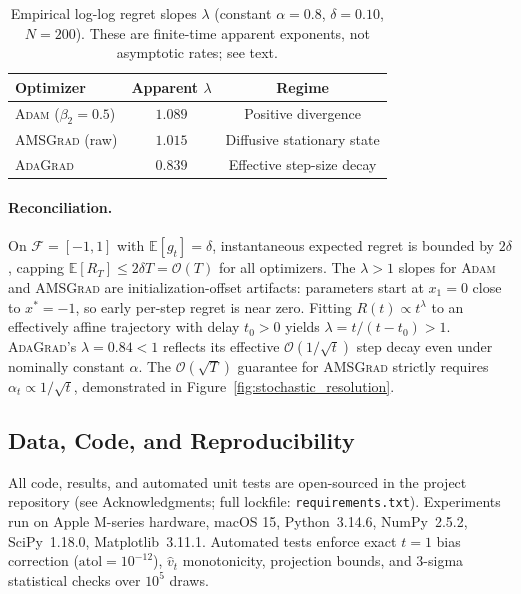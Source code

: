 \begin{table}[h]
\centering
\scriptsize
\caption{Empirical log-log regret slopes $\lambda$ (constant $\alpha=0.8$, $\delta=0.10$, $N=200$). These are finite-time apparent exponents, not asymptotic rates; see text.}
\label{tab:lambda_slopes}
\begin{tabular}{lcc}
\toprule
\textbf{Optimizer} & Apparent $\lambda$ & Regime \\
\midrule
\textsc{Adam} ($\beta_2 = 0.5$) & $1.089$ & Positive divergence \\
\textsc{AMSGrad} (raw)          & $1.015$ & Diffusive stationary state \\
\textsc{AdaGrad}                & $0.839$ & Effective step-size decay \\
\bottomrule
\end{tabular}
\end{table}

\paragraph{Reconciliation.}
On $\mathcal{F}=[-1,1]$ with $\mathbb{E}[g_t]=\delta$, instantaneous expected regret is bounded by $2\delta$, capping $\mathbb{E}[R_T] \le 2\delta T = \mathcal{O}(T)$ for all optimizers. The $\lambda > 1$ slopes for \textsc{Adam} and \textsc{AMSGrad} are initialization-offset artifacts: parameters start at $x_1=0$ close to $x^*=-1$, so early per-step regret is near zero. Fitting $R(t) \propto t^\lambda$ to an effectively affine trajectory with delay $t_0 > 0$ yields $\lambda = t/(t-t_0) > 1$. \textsc{AdaGrad}'s $\lambda = 0.84 < 1$ reflects its effective $\mathcal{O}(1/\sqrt{t})$ step decay even under nominally constant $\alpha$. The $\mathcal{O}(\sqrt{T})$ guarantee for \textsc{AMSGrad} strictly requires $\alpha_t \propto 1/\sqrt{t}$, demonstrated in Figure~\ref{fig:stochastic_resolution}.

\subsection{Data, Code, and Reproducibility}
All code, results, and automated unit tests are open-sourced in the project repository (see Acknowledgments; full lockfile: \nolinkurl{requirements.txt}). Experiments run on Apple M-series hardware, macOS 15, Python~3.14.6, NumPy~2.5.2, SciPy~1.18.0, Matplotlib~3.11.1. Automated tests enforce exact $t=1$ bias correction ($\text{atol}=10^{-12}$), $\hat{v}_t$ monotonicity, projection bounds, and 3-sigma statistical checks over $10^5$ draws.
